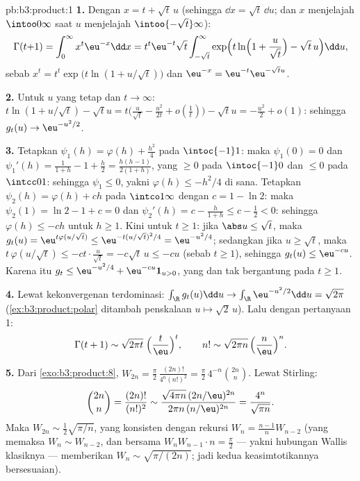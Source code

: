\begin{solution}{pb:b3:product:1}
\textbf{1.} Dengan $x = t + \sqrt t\,u$ (sehingga $\dd x = \sqrt
t\,\dd u$; dan $x$ menjelajah $\intoo0\infty$ saat $u$ menjelajah
$\intoo{-\sqrt t}\infty$):
\[
\Gamma(t{+}1) = \int_0^\infty x^t\eu^{-x}\dd x
= t^t\eu^{-t}\sqrt t\int_{-\sqrt t}^{\infty}
\exp\Bigl(t\ln\Bigl(1 + \frac u{\sqrt t}\Bigr) - \sqrt
t\,u\Bigr)\dd u,
\]
sebab $x^t = t^t\exp\bigl(t\ln(1 + u/\sqrt t)\bigr)$ dan
$\eu^{-x} = \eu^{-t}\eu^{-\sqrt tu}$.

\textbf{2.} Untuk $u$ yang tetap dan $t \to \infty$: $t\ln(1 +
u/\sqrt t) - \sqrt tu = t\bigl(\frac u{\sqrt t} -
\frac{u^2}{2t} + o(\frac1t)\bigr) - \sqrt tu = -\frac{u^2}2 +
o(1)$: sehingga $g_t(u) \to \eu^{-u^2/2}$.

\textbf{3.} Tetapkan $\psi_1(h) = \varphi(h) + \frac{h^2}4$ pada
$\intoc{-1}1$: maka $\psi_1(0) = 0$ dan $\psi_1'(h) = \frac1{1+h} -
1 + \frac h2 = \frac{h(h-1)}{2(1+h)}$, yang $\geq 0$ pada
$\intoc{-1}0$ dan $\leq 0$ pada $\intcc01$: sehingga $\psi_1 \leq 0$,
yakni $\varphi(h) \leq -h^2/4$ di sana. Tetapkan $\psi_2(h) =
\varphi(h) + ch$ pada $\intco1\infty$ dengan $c = 1 - \ln2$: maka $\psi_2(1)
= \ln2 - 1 + c = 0$ dan $\psi_2'(h) = c - \frac h{1+h} \leq c -
\frac12 < 0$: sehingga $\varphi(h) \leq -ch$ untuk $h \geq 1$. Kini untuk $t
\geq 1$: jika $\abs u \leq \sqrt t$, maka $g_t(u) =
\eu^{t\varphi(u/\sqrt t)} \leq \eu^{-t(u/\sqrt t)^2/4} =
\eu^{-u^2/4}$; sedangkan jika $u \geq \sqrt t$, maka $t\,\varphi(u/\sqrt t) \leq
-ct\cdot\frac u{\sqrt t} = -c\sqrt t\,u \leq -cu$ (sebab $t \geq
1$), sehingga $g_t(u) \leq \eu^{-cu}$. Karena itu $g_t \leq \eu^{-u^2/4} +
\eu^{-cu}\mathbf 1_{u>0}$, yang  dan tak bergantung pada $t \geq
1$.

\textbf{4.} Lewat kekonvergenan terdominasi: $\int_\R g_t(u)\dd u \to
\int_\R\eu^{-u^2/2}\dd u = \sqrt{2\pi}$
(\cref{ex:b3:product:polar} ditambah penskalaan
$u\mapsto\sqrt2\,u$). Lalu dengan pertanyaan 1:
\[
\Gamma(t + 1) \sim \sqrt{2\pi t}\;\Bigl(\frac
t\eu\Bigr)^t,\qquad
n! \sim \sqrt{2\pi n}\,\Bigl(\frac n\eu\Bigr)^n .
\]

\textbf{5.} Dari \cref{exo:b3:product:8}, $W_{2n} =
\frac\pi2\,\frac{(2n)!}{4^n(n!)^2} =
\frac\pi2\,4^{-n}\binom{2n}n$. Lewat Stirling:
\[
\binom{2n}{n} = \frac{(2n)!}{(n!)^2}
\sim \frac{\sqrt{4\pi n}\,(2n/\eu)^{2n}}
{2\pi n\,(n/\eu)^{2n}} = \frac{4^n}{\sqrt{\pi n}} .
\]
Maka $W_{2n} \sim \frac12\sqrt{\pi/n}$, yang konsisten dengan
rekursi $W_n = \frac{n-1}nW_{n-2}$ (yang memaksa $W_n \sim
W_{n-2}$, dan bersama $W_nW_{n-1}\cdot n = \frac\pi2$ --- yakni
hubungan Wallis klasiknya --- memberikan $W_n \sim
\sqrt{\pi/(2n)}$; jadi kedua keasimtotikannya bersesuaian).


\end{solution}
